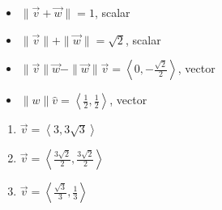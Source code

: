 \begin{enumerate}
\begin{multicols}{2}
\begin{itemize}
\end{itemize}

\end{multicols}

\begin{multicols}{2}

\begin{itemize}

\item $\| \vec{v} + \vec{w} \| = 1$, scalar
\item  $\| \vec{v} \| + \| \vec{w}\| = \sqrt{2}$, scalar

\end{itemize}

\end{multicols}

\begin{multicols}{2}

\begin{itemize}

\item $\| \vec{v} \| \vec{w} - \| \vec{w} \| \vec{v}  = \left<0,-\frac{\sqrt{2}}{2}\right>$, vector
\item $\|w\| \hat{v}= \left<\frac{1}{2}, \frac{1}{2}\right>$, vector

\end{itemize}

\end{multicols}

\setcounter{HW}{\value{enumi}}

\end{enumerate}

\begin{multicols}{3}

\begin{enumerate}

\setcounter{enumi}{\value{HW}}

\item $\vec{v} = \left<3,3\sqrt{3}\right>$
\item $\vec{v} = \left<\frac{3\sqrt{2}}{2},\frac{3\sqrt{2}}{2}\right>$
\item $\vec{v} = \left< \frac{\sqrt{3}}{3}, \frac{1}{3}\right>$

\setcounter{HW}{\value{enumi}}

\end{enumerate}

\end{multicols}

